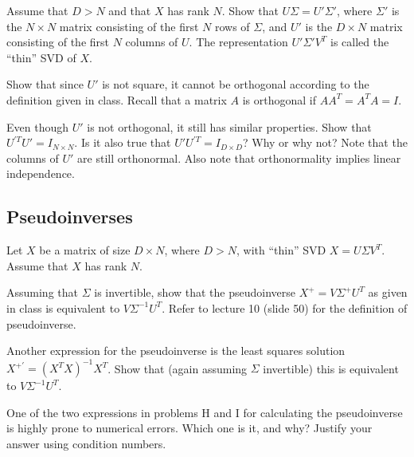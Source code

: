 \problem[3] Assume that $D > N$ and that $X$ has rank $N$. Show that $U\Sigma = U'\Sigma'$, where $\Sigma'$ is the $N \times N$ matrix consisting of the first $N$ rows of $\Sigma$, and $U'$ is the $D \times N$ matrix consisting of the first $N$ columns of $U$. The representation $U'\Sigma' V^T$ is called the ``thin'' SVD of $X$.

\begin{solution}
  \end{solution}

\problem[3] Show that since $U'$ is not square, it cannot be orthogonal according to the definition given in class. Recall that a matrix $A$ is orthogonal if $A A^T = A^T A = I$.

\begin{solution}
  \end{solution} 

\problem[4] Even though $U'$ is not orthogonal, it still has similar properties. Show that $U^{'T} U' = I_{N \times N}$. Is it also true that $U' U^{'T} = I_{D \times D}$? Why or why not? Note that the columns of $U'$ are still orthonormal. Also note that orthonormality implies linear independence.

\begin{solution}
  \end{solution}

\subsection{Pseudoinverses} Let $X$ be a matrix of size $D \times N$, where $D > N$, with ``thin'' SVD $X = U\Sigma V^T$. Assume that $X$ has rank $N$.

\problem[4] Assuming that $\Sigma$ is invertible, show that the pseudoinverse $X^+ = V\Sigma^+ U^T$ as given in class is equivalent to $V\Sigma^{-1} U^T$. Refer to lecture 10 (slide 50) for the definition of pseudoinverse.

\begin{solution}
  \end{solution}

\problem[4] Another expression for the pseudoinverse is the least squares solution $X^{+'} = (X^T X)^{-1}X^T$. Show that (again assuming $\Sigma$ invertible) this is equivalent to $V\Sigma^{-1}U^T$.

\begin{solution}
 \end{solution}

\problem[2] One of the two expressions in problems H and I for calculating the pseudoinverse is highly prone to numerical errors. Which one is it, and why? Justify your answer using condition numbers.

